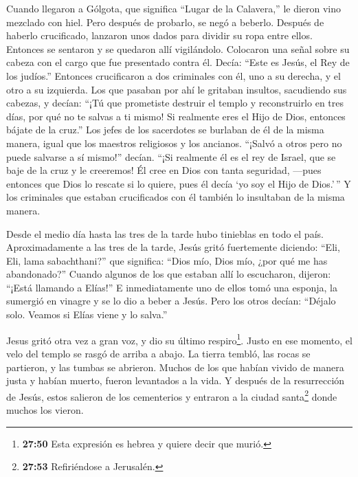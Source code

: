  Cuando llegaron a Gólgota, que significa ``Lugar de la
Calavera,''  le dieron vino mezclado con hiel. Pero después
de probarlo, se negó a beberlo.  Después de haberlo
crucificado, lanzaron unos dados para dividir su ropa entre ellos.
 Entonces se sentaron y se quedaron allí vigilándolo.
 Colocaron una señal sobre su cabeza con el cargo que fue
presentado contra él. Decía: ``Este es Jesús, el Rey de los judíos.''
 Entonces crucificaron a dos criminales con él, uno a su
derecha, y el otro a su izquierda.  Los que pasaban por ahí
le gritaban insultos, sacudiendo sus cabezas,  y decían:
``¡Tú que prometiste destruir el templo y reconstruirlo en tres días,
por qué no te salvas a ti mismo! Si realmente eres el Hijo de Dios,
entonces bájate de la cruz.''  Los jefes de los sacerdotes
se burlaban de él de la misma manera, igual que los maestros religiosos
y los ancianos.  ``¡Salvó a otros pero no puede salvarse a
sí mismo!'' decían. ``¡Si realmente él es el rey de Israel, que se baje
de la cruz y le creeremos!  Él cree en Dios con tanta
seguridad, ---pues entonces que Dios lo rescate si lo quiere, pues él
decía `yo soy el Hijo de Dios.'\,''  Y los criminales que
estaban crucificados con él también lo insultaban de la misma manera.

 Desde el medio día hasta las tres de la tarde hubo
tinieblas en todo el país.  Aproximadamente a las tres de
la tarde, Jesús gritó fuertemente diciendo: ``Eli, Eli, lama
sabachthani?'' que significa: ``Dios mío, Dios mío, ¿por qué me has
abandonado?''  Cuando algunos de los que estaban allí lo
escucharon, dijeron: ``¡Está llamando a Elías!''  E
inmediatamente uno de ellos tomó una esponja, la sumergió en vinagre y
se lo dio a beber a Jesús.  Pero los otros decían: ``Déjalo
solo. Veamos si Elías viene y lo salva.''

 Jesus gritó otra vez a gran voz, y dio su último
respiro\footnote{\textbf{27:50} Esta expresión es hebrea y quiere decir
  que murió.}.  Justo en ese momento, el velo del templo se
rasgó de arriba a abajo. La tierra tembló, las rocas se partieron,
 y las tumbas se abrieron. Muchos de los que habían vivido
de manera justa y habían muerto, fueron levantados a la vida.
 Y después de la resurrección de Jesús, estos salieron de
los cementerios y entraron a la ciudad santa\footnote{\textbf{27:53}
  Refiriéndose a Jerusalén.} donde muchos los vieron.

